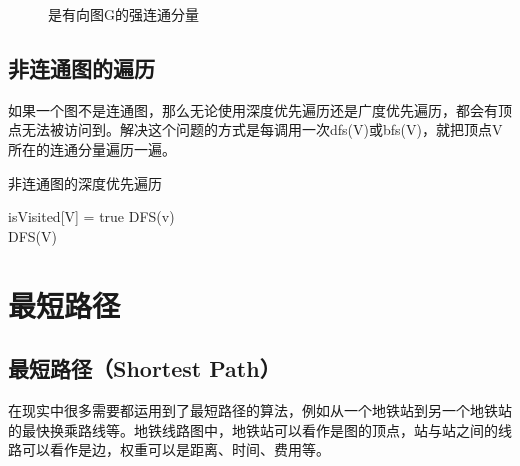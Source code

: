 \begin{figure}[H]
	\centering
	\caption{是有向图G的强连通分量}
\end{figure}

\vspace{0.5cm}

\subsection{非连通图的遍历}

如果一个图不是连通图，那么无论使用深度优先遍历还是广度优先遍历，都会有顶点无法被访问到。解决这个问题的方式是每调用一次dfs(V)或bfs(V)，就把顶点V所在的连通分量遍历一遍。\\

\begin{algorithm}[H]
	\caption{非连通图的深度优先遍历}
	\begin{algorithmic}[1]
		\State isVisited[V] = true
		\State DFS(v)
		\EndIf
		\EndFor
		\EndProcedure
		\\
		\State DFS(V)
		\EndIf
		\EndFor
		\EndProcedure
	\end{algorithmic}
\end{algorithm}

\newpage

\section{最短路径}

\subsection{最短路径（Shortest Path）}

在现实中很多需要都运用到了最短路径的算法，例如从一个地铁站到另一个地铁站的最快换乘路线等。地铁线路图中，地铁站可以看作是图的顶点，站与站之间的线路可以看作是边，权重可以是距离、时间、费用等。\\

